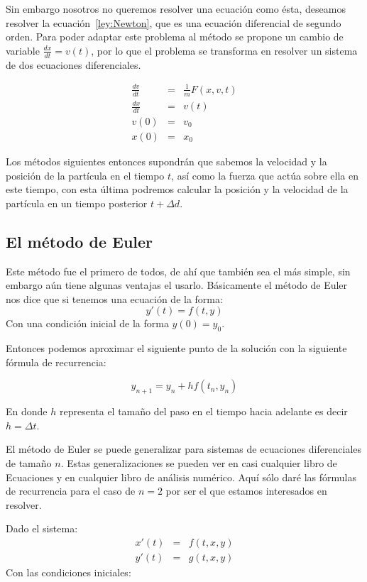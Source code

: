 Sin embargo nosotros no queremos resolver una ecuación como ésta, deseamos resolver la ecuación~\ref{ley:Newton}, que es una ecuación diferencial de segundo orden. Para poder adaptar este problema al método se propone un cambio de variable $\frac{dx}{dt} = v(t)$, por lo que el problema se transforma en resolver un sistema de dos ecuaciones diferenciales.

\begin{eqnarray}
\frac{dv}{dt} & = & \frac{1}{m} F(x, v, t) \nonumber \\
\frac{dx}{dt} & = & v(t) \nonumber \\
v(0) & = & v_0 \nonumber \\
x(0) & = & x_0 \nonumber
\end{eqnarray}

Los métodos siguientes entonces supondrán que sabemos la velocidad y la posición de la partícula en el tiempo $t$, así como la fuerza que actúa sobre ella en este tiempo, con esta última podremos calcular la posición y la velocidad de la partícula en un tiempo posterior $t + \Delta d$.

\subsection{El método de Euler}
Este método fue el primero de todos, de ahí que también sea el más simple, sin embargo aún tiene algunas ventajas el usarlo. Básicamente el método de Euler nos dice que si tenemos una ecuación de la forma:
$$y'(t) = f(t, y)$$
Con una condición inicial de la forma $y(0)=y_0$.

Entonces podemos aproximar el siguiente punto de la solución con la siguiente fórmula de recurrencia:

$$y_{n+1} = y_n + hf(t_n, y_n)$$

En donde $h$ representa el tamaño del paso en el tiempo hacia adelante es decir $h = \Delta t$.

El método de Euler se puede generalizar para sistemas de ecuaciones diferenciales de tamaño $n$. Estas generalizaciones se pueden ver en casi cualquier libro de Ecuaciones y en cualquier libro de análisis numérico. Aquí sólo daré las fórmulas de recurrencia para el caso de $n=2$ por ser el que estamos interesados en resolver.

Dado el sistema:
\begin{eqnarray}
x'(t) & = & f(t, x, y) \nonumber \\
y'(t) & = & g(t, x, y)
\label{sistema:general}
\end{eqnarray}
Con las condiciones iniciales:

